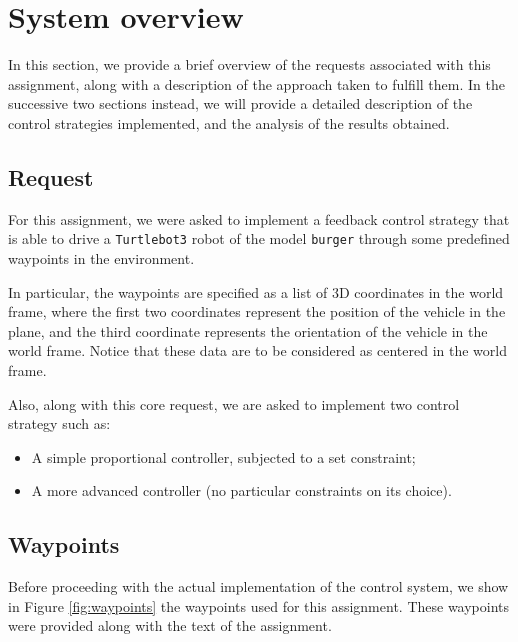 \section{System overview}
\label{sec:system_overview}

In this section, we provide a brief overview of the requests associated with this assignment, along with a description of the approach taken to fulfill them.
In the successive two sections instead, we will provide a detailed description of the control strategies implemented, and the analysis of the results obtained.

\subsection{Request}
\label{subsec:request}

For this assignment, we were asked to implement a feedback control strategy that is able to drive a \texttt{Turtlebot3} robot of the model \texttt{burger} through some predefined waypoints in the environment.

In particular, the waypoints are specified as a list of 3D coordinates in the world frame, where the first two coordinates represent the position of the vehicle in the plane, and the third coordinate represents the orientation of the vehicle in the world frame.
Notice that these data are to be considered as centered in the world frame.

Also, along with this core request, we are asked to implement two control strategy such as:

\begin{itemize}
    \item A simple proportional controller, subjected to a set constraint;
    \item A more advanced controller (no particular constraints on its choice).
\end{itemize}



\subsection{Waypoints}
\label{subsec:waypoints}

Before proceeding with the actual implementation of the control system, we show in Figure \ref{fig:waypoints} the waypoints used for this assignment.
These waypoints were provided along with the text of the assignment.

